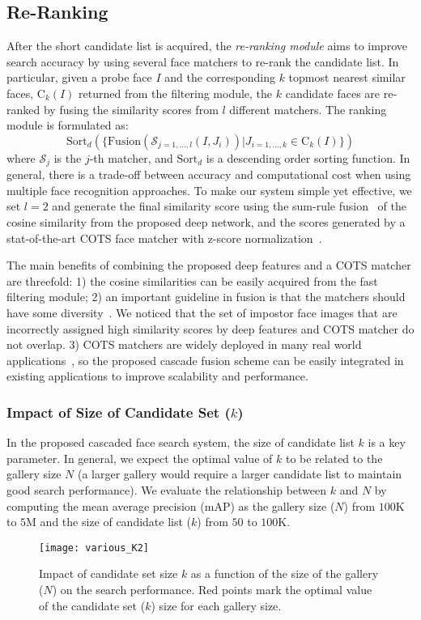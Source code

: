\documentclass[10pt,journal,compsoc]{IEEEtran}
\begin{document}
\subsection{Re-Ranking}
After the short candidate list is acquired, the \emph{re-ranking module} aims to improve search accuracy by using several face matchers to re-rank the candidate list. In particular, given a probe face $I$ and the corresponding $k$ topmost nearest similar faces, $\mathrm{C}_k(I)$ returned from the filtering module, the $k$ candidate faces are re-ranked by fusing the similarity scores from $l$ different matchers. The ranking module is formulated as:
\begin{equation}
\mathrm{Sort}_{d}(\{ \mathrm{Fusion}(\mathcal{S}_{j=1,\ldots,l}(I, J_i)) | J_{i=1,\ldots, k} \in \mathrm{C}_k(I) \})
\end{equation}
\noindent where $\mathcal{S}_j$ is the $j$-th matcher, and $\mathrm{Sort}_{d}$ is a descending order sorting function. In general, there is a trade-off between accuracy and computational cost when using multiple face recognition approaches. To make our system simple yet effective, we set $l=2$ and generate the final similarity score using the sum-rule fusion~\cite{fusion:occ} of the cosine similarity from the proposed deep network, and the scores generated by a stat-of-the-art COTS face matcher with z-score normalization~\cite{zscore}.

The main benefits of combining the proposed deep features and a COTS matcher are threefold:
1) the cosine similarities can be easily acquired from the fast filtering module;
2) an important guideline in fusion is that the matchers should have some diversity~\cite{fusion:occ, fusion:rule}. We noticed that the set of impostor face images that are incorrectly assigned high similarity scores by deep features and COTS matcher do not overlap.
3) COTS matchers are widely deployed in many real world applications~\cite{fvrt:2014}, so the proposed cascade fusion scheme can be easily integrated in existing applications to improve scalability and performance.

\subsubsection{Impact of Size of Candidate Set ($k$)}
In the proposed cascaded face search system, the size of candidate list $k$ is a key parameter. In general, we expect the optimal value of $k$ to be related to the gallery size $N$ (a larger gallery would require a larger candidate list to maintain good search performance). We evaluate the relationship between $k$ and $N$ by computing the mean average precision (mAP) as the gallery size ($N$) from $100$K to $5$M and the size of candidate list ($k$) from $50$ to $100$K.
\begin{figure}[htbp]
\centering
  \texttt{[image: various\_K2]}
  \caption{Impact of candidate set size $k$ as a function of the size of the gallery ($N$) on the search performance. Red points mark the optimal value of the candidate set ($k$) size for each gallery size.}\label{fig:exp_k}
\end{figure}
\end{document}
